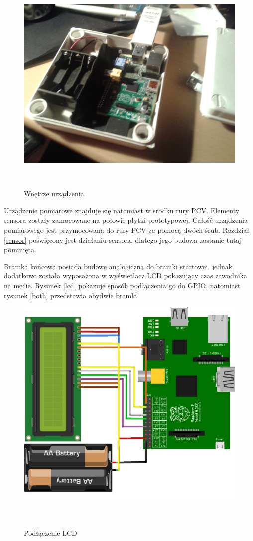 \documentclass[11pt,a4paper, twoside]{article}
\begin{document}
\begin{figure}[H]
\begin{center}
\includegraphics[scale=0.08]{./img/insides1.jpg}
\caption{Wnętrze urządzenia}
$\label{skrzynka-in}$
\end{center}
\end{figure}
Urządzenie pomiarowe znajduje się natomiast w srodku rury PCV. Elementy sensora zostały zamocowane na połowie płytki prototypowej. Całość urządzenia pomiarowego jest przymocowana do rury PCV za pomocą dwóch śrub. Rozdział \ref{sensor} poświęcony jest działaniu sensora, dlatego jego budowa zostanie tutaj pominięta.

Bramka końcowa posiada budowę analogiczną do bramki startowej, jednak dodatkowo została wyposażona w wyświetlacz LCD pokazujący czas zawodnika na mecie. Rysunek \ref{lcd} pokazuje sposób podłączenia go do GPIO, natomiast rysunek \ref{both} przedstawia obydwie bramki. 
\begin{figure}[H]
\begin{center}
\includegraphics[scale=0.125]{./img/lcd_bb.png}
\caption{Podłączenie LCD}
$\label{lcd}$
\end{center}
\end{figure}
\end{document}
